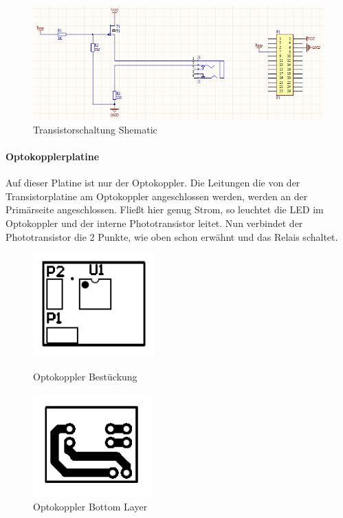 \begin{figure}[H]
\includegraphics[keepaspectratio=true, width=17cm]{images/rpi/Transistorschaltung_Schematic.png}
\caption{Transistorschaltung Shematic}
\label{fig:report_hardware_TransSche}
\end{figure}
\paragraph{Optokopplerplatine}
Auf dieser Platine ist nur der Optokoppler. Die Leitungen die von der Transistorplatine am Optokoppler angeschlossen werden, werden an der Primärseite angeschlossen. Fließt hier genug Strom, so leuchtet die LED im Optokoppler und der interne Phototransistor leitet. Nun verbindet der Phototransistor die 2 Punkte, wie oben schon erwähnt und das Relais schaltet.\\
\begin{figure}[H]
\centering
	\begin{minipage}{7cm}
		\centering
		\includegraphics[keepaspectratio=true, height=4cm]{images/rpi/Optokoppler_Bestueckung.png}
		\caption{Optokoppler Bestückung}
		\label{fig:report_hardware_OptBest}
	\end{minipage}
	\hspace{1cm}
	\begin{minipage}{7cm}
		\centering
		\includegraphics[keepaspectratio=true, height=4cm]{images/rpi/Optokoppler_BottomLayer.png}
		\caption{Optokoppler Bottom Layer}
		\label{fig:report_hardware_OptBL}
	\end{minipage}
\end{figure}
